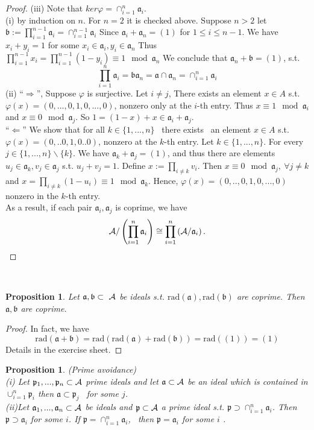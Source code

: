 \documentclass[11pt]{article}
\newtheorem{prop}[thm]{Proposition}
\newcommand{\sca}{{\mathfrak a}}
\newcommand{\scb}{{\mathfrak b}}
\newcommand{\scp}{{\mathfrak p}}
\newcommand{\cala}{{\cal A}}
\begin{document}
\begin{proof}
(iii) Note that $ker \varphi =\cap^n_{i=1}\sca_i$.\\
(i) by induction on $n$.
For $n=2$ it is checked above. Suppose $n>2$ let $\scb:=\prod_{i=1}^{n-1}\sca_i=\cap^{n-1}_{i=1}\sca_i$
Since $\sca_i+\sca_n=(1)$ for $1\leq i\leq n-1$. We have $x_i+y_i=1$ for some $x_i\in \sca_i, y_i\in \sca_n$
Thus $\prod_{i=1}^{n-1}x_i= \prod_{i=1}^{n-1}(1-y_i) \equiv 1 \mod \sca_n$
We conclude that $\sca_n+\scb=(1)$, s.t. 
$$
\prod^n_{i=1}\sca_i=\scb \sca_n=\sca\cap \sca_n=\cap_{i=1}^n\sca_i
$$
(ii) ``$\Longrightarrow$'', Suppose $\varphi $ is surjective. Let $i\neq j$, There exists an element $x\in A$ s.t. $\varphi(x)=(0,...,0,1,0,...,0)$, nonzero only at the $i$-th entry.
Thus $x\equiv  1 \mod \sca_i$ and $x\equiv 0\mod \sca_j$.
So $1=(1-x)+x\in \sca_i+\sca_j$.\\
``$\Longleftarrow$'' We show that for all $k\in \{1,...,n\}$
 there exists  an element $x\in A$ s.t. $\varphi(x)=(0,..0,1,0..0)$, nonzero at the $k$-th entry.
Let $k\in \{1,...,n\}$. For every $j\in \{1,...,n\}\backslash\{k\}$.
We have $\sca_k+\sca_j=(1)$, and thus there are elements $u_j\in\sca_k,v_j\in \sca_j$
s.t. $u_j+v_j=1$.
Define $x:=\prod_{i\neq k}v_i$. Then $x\equiv 0 \mod \sca_j,\ \forall j\neq k$ and $x=\prod_{i\neq k}(1-u_i)\equiv 1\mod \sca_k$.
Hence, $\varphi(x)=(0,..,0,1,0,...,0)$ nonzero in the $k$-th entry.\\
As a result, if each pair $\sca_i,\sca_j$ is coprime, we have 
$$
\cala/\left(\prod_{i=1}^n\sca_i\right)\cong \prod_{i=1}^n\left(\cala/\sca_i\right).
$$
\end{proof}

 
\begin{prop}\label{prop:charaterization_coprime_ideals}
Let $\sca,\scb\subset  \cala$ be ideals s.t. $\text{rad}(\sca),\text{rad}(\scb)$ are coprime. Then $\sca, \scb$ are coprime.
\end{prop}
\begin{proof}
In fact, we have
$$
 \text{rad}(\sca+\scb)=\text{rad}(\text{rad}(\sca)+\text{rad}(\scb))=\text{rad}((1))=(1)
$$
Details in the exercise sheet.
\end{proof}

\begin{prop}\label{prop:prime_avoidance}(Prime avoidance) \\
(i) Let $\scp_1,..., \scp_n\subset \cala$ prime ideals and let $\sca \subset \cala$ be an ideal which is contained in $\cup_{i=1}^n\scp_i$ then $\sca\subset \scp_j$  for some $j$.\\
(ii)Let $\sca_1,...,\sca_n\subset \cala$ be ideals and $\scp \subset \cala$ a prime ideal s.t. $\scp \supset \cap_{i=1}^n\sca_i$.
Then $\scp\supset \sca_i$ for some $i$.
If $\scp=\cap_{i=1}^n\sca_i$,  then $\scp =\sca_i $ for some $i$ .
\end{prop}
\end{document}
